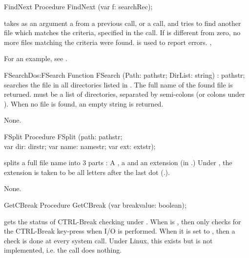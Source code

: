 
\begin{procedure}{FindNext}
\Declaration
Procedure FindNext (var f: searchRec);
\Description

 takes as an argument a  from a previous
 call, or a  call, and tries to find another
file which matches the criteria, specified in the  call.
If  is different from zero, no more files matching the
criteria were found.
\Errors
{} is used to report errors.
\SeeAlso
{}, 
\end{procedure}
For an example, see .
\begin{functionl}{FSearch}{Dos:FSearch}
\Declaration
Function FSearch (Path: pathstr; DirList: string) : pathstr;
\Description
{} searches the file  in all directories listed in
. The full name of the found file is returned.
 must be a list of directories, separated by semi-colons (or
colons under \linux).
When no file is found, an empty string is returned.

\Errors
None.
\SeeAlso
{}
\end{functionl}


 
\begin{procedure}{FSplit}
\Declaration
Procedure FSplit (path: pathstr; \\ var dir: dirstr; var name: namestr;
  var ext: extstr);
\Description

 splits a full file name into 3 parts : A , a
 and an extension  (in .) 
Under \linux, the extension is taken to be all letters after the last dot
(.).

\Errors
None.
\SeeAlso
{}
\end{procedure}


\begin{procedure}{GetCBreak}
\Declaration
Procedure GetCBreak (var breakvalue: boolean);
\Description

 gets the status of CTRL-Break checking under \dos.
When  is , then \dos only checks for the 
CTRL-Break key-press when I/O is performed. When it is set to ,
then a check is done at every system call.
\Errors
Under Linux, this exists but is 
not implemented, i.e. the call does nothing.
\SeeAlso
{}
\end{procedure}

